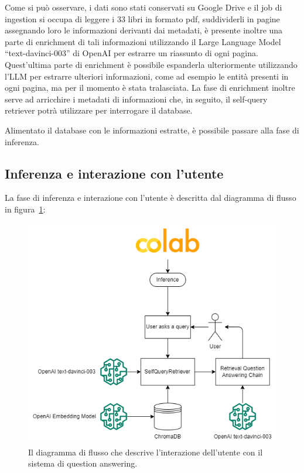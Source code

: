 Come si può osservare, i dati sono stati conservati su Google Drive e il job di ingestion si occupa di leggere i 33 libri in formato pdf,
suddividerli in pagine assegnando loro le informazioni derivanti dai metadati, è presente inoltre una parte di enrichment di tali informazioni 
utilizzando il Large Language Model ``text-davinci-003'' di OpenAI per estrarre un riassunto di ogni pagina. Quest'ultima parte di enrichment è possibile espanderla ulteriormente
utilizzando l'LLM per estrarre ulteriori informazioni, come ad esempio le entità presenti in ogni pagina, ma per il momento è stata tralasciata.
La fase di enrichment inoltre serve ad arricchire i metadati di informazioni che, in seguito, il self-query retriever potrà utilizzare per interrogare il database.

Alimentato il database con le informazioni estratte, è possibile passare alla fase di inferenza.

\subsection[Inferenza]{Inferenza e interazione con l'utente}

La fase di inferenza e interazione con l'utente è descritta dal diagramma di flusso in figura~\ref{fig:infer}:

\begin{figure}[H]
    \centering
    \includegraphics[height=0.3\pdfpageheight]{images/Inference.png}
    \caption[Ingestion]{Il diagramma di flusso che descrive l'interazione dell'utente con il sistema di question answering.}
    \label{fig:infer}
\end{figure}

